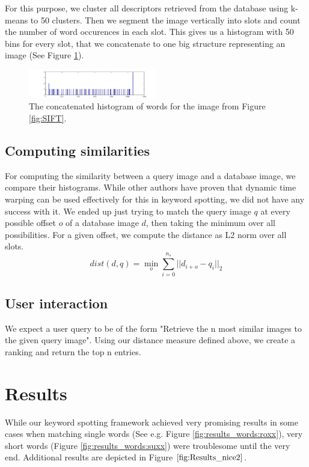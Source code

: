 \documentclass[conference]{IEEEtran}
\begin{document}
For this purpose, we cluster all descriptors retrieved from the database using k-means to
50 clusters. Then we segment the image vertically into slots and count the number of word occurences
in each slot. This gives us a histogram with 50 bins for every slot, that we concatenate to one
big structure representing an image (See Figure \ref{fig:histogram}).
\begin{figure}[!t]
\centering
\includegraphics[width=0.5\textwidth]{kvniginne_histogram}
\caption{The concatenated histogram of words for the image from Figure \ref{fig:SIFT}.}
\label{fig:histogram}
\end{figure}

\subsection{Computing similarities}
\label{sub:similarities}
For computing the similarity between a query image and a database image, 
we compare their histograms. While other authors have proven that dynamic time warping can be
used effectively for this in keyword spotting, we did not have any success with it. We ended
up just trying to match the query image $q$ 
at every possible offset $o$ of a database image $d$, then taking
the minimum over all possibilities.
 For a given offset, we compute the distance as L2 norm over all slots.
\begin{equation}
	dist(d, q) = \min_o \sum_{i = 0}^{n_s} || d_{i + o} - q_{i}  ||_2
\end{equation}


\subsection{User interaction}
\label{sub:user interaction}
We expect a user query to be of the form "Retrieve the n most similar images to the given query
image". Using our distance measure defined above, 
we create a ranking and return the top n entries.

\section{Results}
While our keyword spotting framework achieved very promising results in some cases when matching single words (See e.g. Figure \ref{fig:results_words:roxx}), very short words (Figure \ref{fig:results_words:suxx}) were troublesome until the very end. Additional results are depicted in Figure $\ref{fig:Results_nice2}$.
\end{document}

